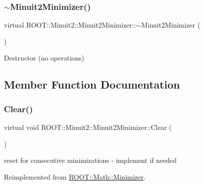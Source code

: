 \subsubsection{\texorpdfstring{$\sim$Minuit2Minimizer()}{~Minuit2Minimizer()}\hspace{0.1cm}{\footnotesize\ttfamily [3/3]}}
{\footnotesize\ttfamily virtual R\+O\+O\+T\+::\+Minuit2\+::\+Minuit2\+Minimizer\+::$\sim$\+Minuit2\+Minimizer (\begin{DoxyParamCaption}{ }\end{DoxyParamCaption})\hspace{0.3cm}{\ttfamily [virtual]}}

Destructor (no operations) 

\subsection{Member Function Documentation}
\mbox{\label{classROOT_1_1Minuit2_1_1Minuit2Minimizer_a11e6ce9a4285080548f9855b78ca83b4}} 
\subsubsection{\texorpdfstring{Clear()}{Clear()}\hspace{0.1cm}{\footnotesize\ttfamily [1/3]}}
{\footnotesize\ttfamily virtual void R\+O\+O\+T\+::\+Minuit2\+::\+Minuit2\+Minimizer\+::\+Clear (\begin{DoxyParamCaption}{ }\end{DoxyParamCaption})\hspace{0.3cm}{\ttfamily [virtual]}}



reset for consecutive minimizations -\/ implement if needed 



Reimplemented from \mbox{\hyperlink{classROOT_1_1Math_1_1Minimizer_ad7308846baecf68fb0dbc2d5e4caa178}{R\+O\+O\+T\+::\+Math\+::\+Minimizer}}.

\mbox{\label{classROOT_1_1Minuit2_1_1Minuit2Minimizer_a11e6ce9a4285080548f9855b78ca83b4}} 
